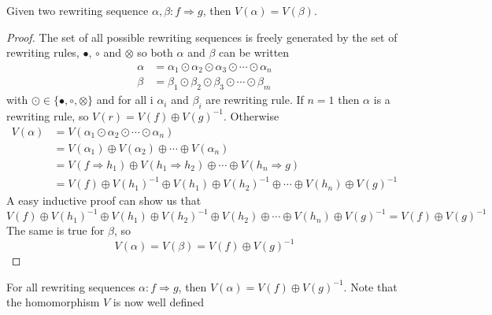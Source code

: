 \documentclass[a4paper]{article}
\begin{document}
\begin{proposition}
  Given two rewriting sequence $\alpha, \beta: f \Rightarrow g$, then $V(\alpha)
    = V(\beta)$.
  
  \begin{proof}
    The set of all possible rewriting sequences is freely generated by the set
      of rewriting rules, $\bullet$, $\circ$ and $\otimes$ so both $\alpha$ and
      $\beta$ can be written
    \begin{align}
      \alpha &= \alpha_1 \odot \alpha_2 \odot \alpha_3 \odot \cdots \odot
        \alpha_n \\
      \beta &= \beta_1 \odot \beta_2 \odot \beta_3 \odot \cdots \odot \beta_m
    \end{align}
    with $\odot \in \{\bullet, \circ, \otimes\}$ and for all i $\alpha_i$ and
      $\beta_i$ are rewriting rule.
    If $n = 1$ then $\alpha$ is a rewriting rule, so $V(r) = V(f) \oplus
      V(g)^{-1}$.
    Otherwise
    \begin{align}
      V(\alpha) &= V(\alpha_1 \odot \alpha_2 \odot \cdots \odot \alpha_n) \\
      &= V(\alpha_1) \oplus V(\alpha_2) \oplus \cdots \oplus V(\alpha_n) \\
      &= V(f \Rightarrow h_1) \oplus V(h_1 \Rightarrow h_2) \oplus \cdots \oplus
        V(h_n \Rightarrow g) \\
      &= V(f) \oplus V(h_1)^{-1} \oplus V(h_1) \oplus V(h_2)^{-1} \oplus \cdots
        \oplus V(h_n) \oplus V(g)^{-1}
    \end{align}
    A easy inductive proof can show us that
    \[
      V(f) \oplus V(h_1)^{-1} \oplus V(h_1) \oplus V(h_2)^{-1} \oplus V(h_2)
        \oplus \cdots \oplus V(h_n) \oplus V(g)^{-1} = V(f) \oplus V(g)^{-1}
    \]
    The same is true for $\beta$, so
    \[
      V(\alpha) = V(\beta) = V(f) \oplus V(g)^{-1}
    \]
  \end{proof}
\end{proposition}

\begin{corollary}
  For all rewriting sequences $\alpha: f \Rightarrow g$, then $V(\alpha) = V(f)
    \oplus V(g)^{-1}$.
  Note that the homomorphism $V$ is now well defined
\end{corollary}
\end{document}
